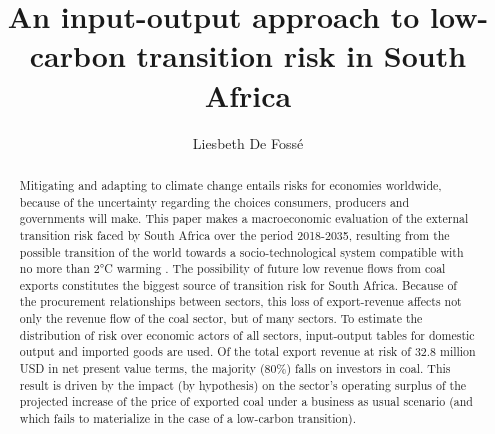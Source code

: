 \documentclass[12pt,english]{article}
\title{An input-output approach to low-carbon transition risk in South Africa}
\author{Liesbeth De Fossé}
\begin{document}

\newcommand{\STAB}[1]{\begin{tabular}{@{}c@{}}#1\end{tabular}}

\begin{abstract}

Mitigating and adapting to climate change entails
risks for economies worldwide, because of the uncertainty regarding the choices consumers, producers and governments will make.
This paper makes a macroeconomic evaluation of the external transition risk faced by South Africa over the period 2018-2035, resulting from the possible transition of the world towards a socio-technological system compatible with no more than 2°C warming%
. %
The possibility of future low revenue flows from coal exports constitutes the biggest source of transition risk for South Africa.
Because of the procurement relationships between sectors, this loss of export-revenue affects not only the revenue flow of the coal sector, but of many sectors. To estimate the distribution of risk over economic actors of all sectors, input-output tables for domestic output and imported goods are used. %
Of the total export revenue at risk of 32.8 million USD in net present value terms, %
the majority (80\%) falls on investors in coal. This result is driven by the impact (by hypothesis) on the sector's operating surplus of the projected increase of the price of exported coal under a business as usual scenario (and which fails to materialize in the case of a low-carbon transition). %

\end{abstract}
\end{document}

